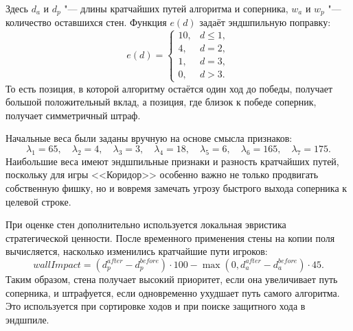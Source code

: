 \documentclass{csmathnotes}
\begin{document}
Здесь $d_a$ и $d_p$ "--- длины кратчайших путей алгоритма и соперника, $w_a$ и $w_p$ "--- количество оставшихся стен. Функция $e(d)$ задаёт эндшпильную поправку:
\[
e(d) =
\begin{cases}
10, & d \le 1, \\
4,  & d = 2, \\
1,  & d = 3, \\
0,  & d > 3.
\end{cases}
\]
То есть позиция, в которой алгоритму остаётся один ход до победы, получает большой положительный вклад, а позиция, где близок к победе соперник, получает симметричный штраф.

Начальные веса были заданы вручную на основе смысла признаков:
\[
\lambda_1 = 65,\quad
\lambda_2 = 4,\quad
\lambda_3 = 3,\quad
\lambda_4 = 18,\quad
\lambda_5 = 6,\quad
\lambda_6 = 165,\quad
\lambda_7 = 175.
\]
Наибольшие веса имеют эндшпильные признаки и разность кратчайших путей, поскольку для игры <<Коридор>> особенно важно не только продвигать собственную фишку, но и вовремя замечать угрозу быстрого выхода соперника к целевой строке.

При оценке стен дополнительно используется локальная эвристика стратегической ценности. После временного применения стены на копии поля вычисляется, насколько изменились кратчайшие пути игроков:
\[
\textit{wallImpact} =
(d_p^{\textit{after}} - d_p^{\textit{before}}) \cdot 100
- \max(0, d_a^{\textit{after}} - d_a^{\textit{before}}) \cdot 45.
\]
Таким образом, стена получает высокий приоритет, если она увеличивает путь соперника, и штрафуется, если одновременно ухудшает путь самого алгоритма. Это используется при сортировке ходов и при поиске защитного хода в эндшпиле.
\end{document}
